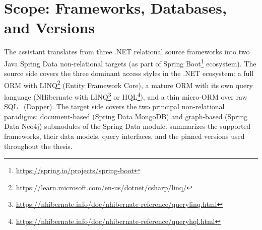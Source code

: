 \section{Scope: Frameworks, Databases, and Versions}
\label{sec:problem-scope}

The assistant translates from three .NET relational source frameworks into two Java Spring Data non-relational targets (as part of Spring Boot\footnote{\url{https://spring.io/projects/spring-boot}} ecosystem). The source side covers the three dominant access styles in the .NET ecosystem: a full ORM with LINQ\footnote{\url{https://learn.microsoft.com/en-us/dotnet/csharp/linq/}} (Entity Framework Core), a mature ORM with its own query language (NHibernate with LINQ\footnote{\url{https://nhibernate.info/doc/nhibernate-reference/querylinq.html}} or HQL\footnote{\url{https://nhibernate.info/doc/nhibernate-reference/queryhql.html}}), and a thin micro-ORM over raw SQL~\cite{kalecheva-ansi-2023-standard} (Dapper). The target side covers the two principal non-relational paradigms: document-based (Spring Data MongoDB) and graph-based (Spring Data Neo4j) submodules of the Spring Data module.  summarizes the supported frameworks, their data models, query interfaces, and the pinned versions used throughout the thesis.

\begin{table}[H]
\centering
\caption{Supported frameworks, data models, query interfaces, and pinned versions. The source frameworks run on .NET~10; the target frameworks on Java~25 / Spring~Boot~4.0.}
\label{tab:scope}
\end{table}

